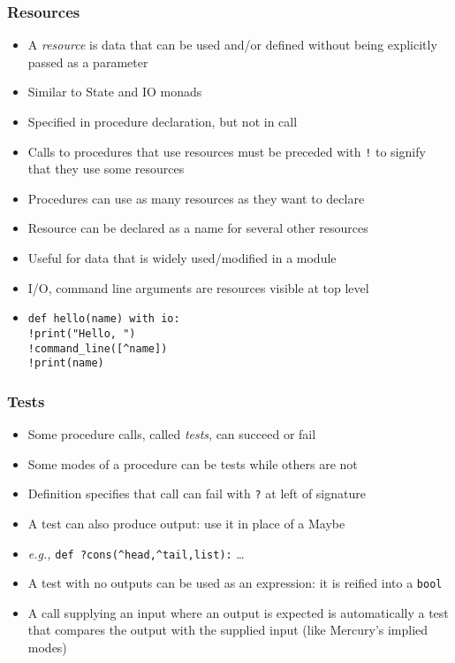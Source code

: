 \documentclass[12pt]{beamer}
\begin{document}
\begin{frame}
\frametitle{Resources}
\begin{itemize}
\item A \emph{resource} is data that can be used and/or defined
  without being explicitly passed as a parameter
\item Similar to State and IO monads
\item Specified in procedure declaration, but not in call
\item Calls to procedures that use resources must be preceded with
  \texttt{!} to signify that they use some resources
\item Procedures can use as many resources as they want to declare
\item Resource can be declared as a name for several other resources
\item Useful for data that is widely used/modified in a module
\item I/O, command line arguments are resources visible at top level
\item \texttt{def hello(name) with io:} \\
\hspace*{2em}\texttt{!print("Hello, ")} \\
\hspace*{2em}\texttt{!command\_line([\^{ }name])} \\
\hspace*{2em}\texttt{!print(name)} \\
\end{itemize}
\end{frame}


\begin{frame}
\frametitle{Tests}
\begin{itemize}
\item Some procedure calls, called \emph{tests}, can succeed or fail
\item Some modes of a procedure can be tests while others are not
\item Definition specifies that call can fail with \texttt{?} at left
  of signature
\item A test can also produce output: use it in place of a Maybe
\item \emph{e.g.,} \texttt{def ?cons(\^{ }head,\^{ }tail,list):} \ldots
\item A test with no outputs can be used as an expression:  it is
  reified into a \texttt{bool}
\item A call supplying an input where an output is expected is
  automatically a test that compares the output with the supplied input
(like Mercury's implied modes)
\end{itemize}
\end{frame}
\end{document}
